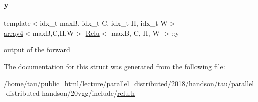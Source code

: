 \subsubsection{\texorpdfstring{y}{y}}
{\footnotesize\ttfamily template$<$idx\+\_\+t maxB, idx\+\_\+t C, idx\+\_\+t H, idx\+\_\+t W$>$ \\
\hyperlink{structarray4}{array4}$<$maxB,C,H,W$>$ \hyperlink{structRelu}{Relu}$<$ maxB, C, H, W $>$\+::y}

output of the forward 

The documentation for this struct was generated from the following file\+:\begin{DoxyCompactItemize}
\item 
/home/tau/public\+\_\+html/lecture/parallel\+\_\+distributed/2018/handson/tau/parallel-\/distributed-\/handson/20vgg/include/\hyperlink{relu_8h}{relu.\+h}\end{DoxyCompactItemize}
